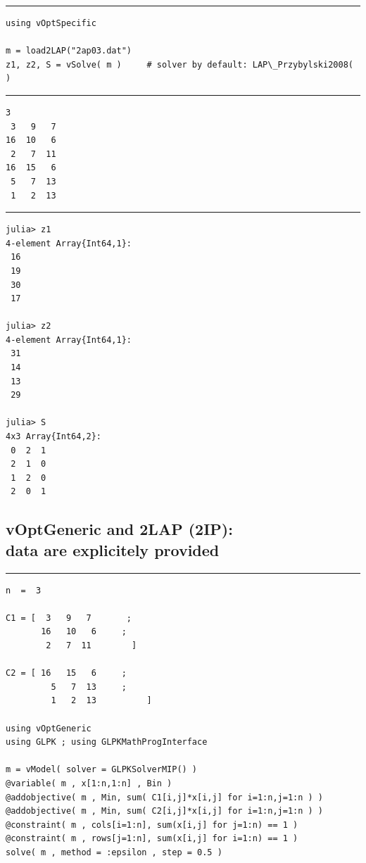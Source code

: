 \documentclass[11pt]{article}
\begin{document}
\vspace{5mm}  \vspace{2mm} \hrule

{%
\begin{lstlisting}
using vOptSpecific   

m = load2LAP("2ap03.dat")
z1, z2, S = vSolve( m )     # solver by default: LAP\_Przybylski2008( ) 
\end{lstlisting}
}


\vspace{5mm}  \vspace{2mm} \hrule
\begin{verbatim}
3
 3   9   7       
16  10   6     
 2   7  11        
16  15   6     
 5   7  13     
 1   2  13 
\end{verbatim}

\vspace{5mm}  \vspace{2mm} \hrule

\begin{verbatim}
julia> z1
4-element Array{Int64,1}:
 16
 19
 30
 17

julia> z2
4-element Array{Int64,1}:
 31
 14
 13
 29

julia> S
4x3 Array{Int64,2}:
 0  2  1
 2  1  0
 1  2  0
 2  0  1
\end{verbatim}
\break

%
%
\subsection{vOptGeneric and 2LAP (2IP):\\ data are explicitely provided}

\vspace{5mm}  \vspace{2mm} \hrule

{%
\begin{lstlisting}
n  =  3

C1 = [  3   9   7       ;
       16   10   6     ;
        2   7  11        ]

C2 = [ 16   15   6     ;
         5   7  13     ;
         1   2  13          ]
       
using vOptGeneric
using GLPK ; using GLPKMathProgInterface

m = vModel( solver = GLPKSolverMIP() )
@variable( m , x[1:n,1:n] , Bin )
@addobjective( m , Min, sum( C1[i,j]*x[i,j] for i=1:n,j=1:n ) )
@addobjective( m , Min, sum( C2[i,j]*x[i,j] for i=1:n,j=1:n ) )
@constraint( m , cols[i=1:n], sum(x[i,j] for j=1:n) == 1 )
@constraint( m , rows[j=1:n], sum(x[i,j] for i=1:n) == 1 )
solve( m , method = :epsilon , step = 0.5 )
\end{lstlisting}
}
\end{document}
